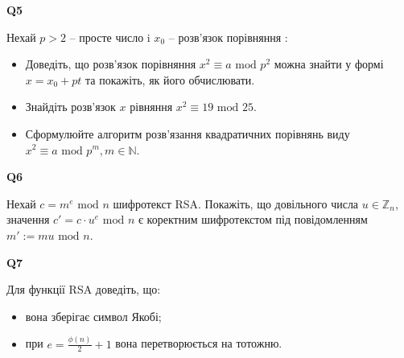 \documentclass{../../test-template}
\begin{document}
\begin{tcolorbox}[lowerbox=invisible,colback=white]
    \begin{minipage}{0.1\textwidth}
        \raggedright
        \vspace*{\fill}
            \textbf{Q5}
        \vspace*{\fill}
        \end{minipage}
        \begin{minipage}{0.75\textwidth}
        Нехай $p>2$ -- просте число i $x_0$ -- розв’язок порівняння : \\
        \begin{itemize}
            \item Доведіть, що розв’язок порівняння $x^2\equiv a\text{ mod }p^2$ можна знайти у формі $x=x_0+pt$ та покажіть, як його обчислювати.
            \item Знайдіть розв’язок $x$ рівняння $x^2\equiv19\text{ mod }25$.
            \item  Сформулюйте алгоритм розв’язання квадратичних порівнянь виду $x^2\equiv a\text{ mod }p^m, m\in \mathbb{N}.$
        \end{itemize}
        \end{minipage}
\end{tcolorbox}

\begin{tcolorbox}[lowerbox=invisible,colback=white]
    \begin{minipage}{0.1\textwidth}
        \raggedright
        \vspace*{\fill}
            \textbf{Q6}
        \vspace*{\fill}
        \end{minipage}
        \begin{minipage}{0.75\textwidth}
        Нехай $c=m^e\text{ mod } n$ шифротекст RSA.  Покажіть, що довільного числа $u\in \mathbb{Z}_n$, значення $c'=c\cdot u^e \text{ mod }n$ є коректним шифротекстом під повідомленням $m':=mu\text{ mod } n$.
        \end{minipage}
\end{tcolorbox}

\begin{tcolorbox}[lowerbox=invisible,colback=white]
    \begin{minipage}{0.1\textwidth}
        \raggedright
        \vspace*{\fill}
            \textbf{Q7}
        \vspace*{\fill}
        \end{minipage}
        \begin{minipage}{0.75\textwidth}
        Для функції RSA доведіть, що:
        \begin{itemize}
            \item вона зберігає символ Якобі;
            \item при $e=\frac{\phi(n)}{2}+1$ вона перетворюється на тотожню.
        \end{itemize}
        \end{minipage}
\end{tcolorbox}
\end{document}
